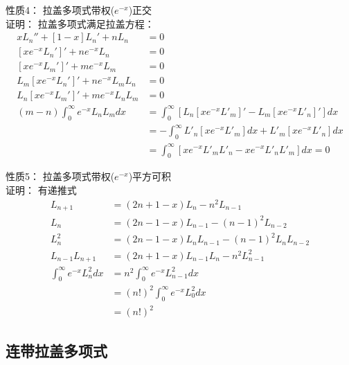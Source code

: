 \begin{frame}
	\alert{	性质4：}  拉盖多项式带权($e^{-x}$)正交 \\
	\alert{	证明：}  拉盖多项式满足拉盖方程：
	\begin{equation*}
		\begin{split}
			x L_n''  + [1 -x] L_n' +n L_n &=0  \\
			[xe^{-x}  L_n'] ' +n e^{-x} L_n &=0  \\
			[xe^{-x}  L_m'] ' +m e^{-x} L_m &=0  \\ 
			L_m[xe^{-x}  L_n'] ' +n e^{-x} L_m L_n &=0  \\
			L_n  [xe^{-x}  L_m'] ' +m e^{-x} L_n L_m& =0  \\ 
			(m-n) \int_{0}^{\infty}  e^{-x} L_n L_m dx &=  \int_{0}^{\infty} [L_n  [xe^{-x}  L' _m] ' - L_m[xe^{-x}  L' _n] '] dx \\
			&=  -\int_{0}^{\infty} L'_n  [xe^{-x}  L' _m] dx + L'_m[xe^{-x}  L' _n]  dx \\
			&=  \int_{0}^{\infty} [xe^{-x}  L' _m L' _n - xe^{-x}  L' _n L' _m]  dx =0
		\end{split}		
	\end{equation*}	
\end{frame}		

\begin{frame}
	\alert{	性质5：}  拉盖多项式带权($e^{-x}$)平方可积 \\
	\alert{	证明：}  有递推式
	\begin{equation*}
		\begin{split}
			L_{n+1} &= (2n+1-x) L_n  -n^2 L_{n-1}  \\
			L_{n} &= (2n-1-x) L_{n-1}  -(n-1)^2 L_{n-2}  \\
			L^2 _{n} &= (2n-1-x) L_n  L_{n-1}  -(n-1)^2 L_n L_{n-2}  \\
			L_{n-1}	L_{n+1} &= (2n+1-x)	L_{n-1}	 L_n  -n^2 	L^2 _{n-1}  \\
			\int_{0}^{\infty}  e^{-x}  L^2 _{n}  dx &=  n^2   \int_{0}^{\infty}  e^{-x}  L^2 _{n-1} dx  \\
			&=  (n!)^2   \int_{0}^{\infty}  e^{-x}  L^2 _{0} dx  \\
			&=  (n!)^2 
		\end{split}		
	\end{equation*}		
\end{frame}		

\subsection{连带拉盖多项式}

